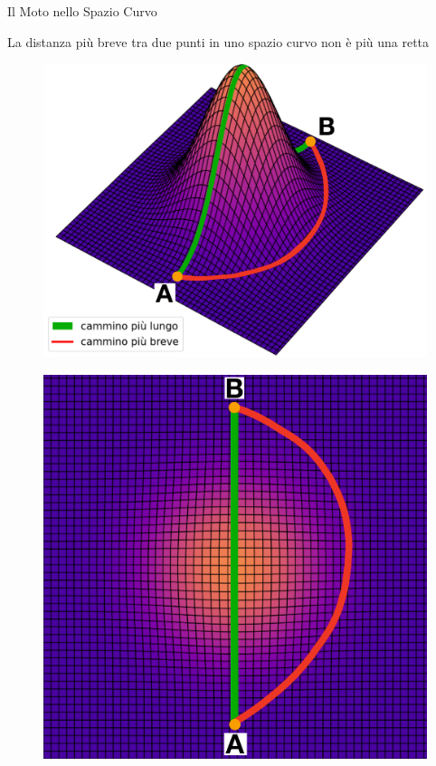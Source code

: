 \begin{frame}{Il Moto nello Spazio Curvo}

    La distanza più breve tra due punti in uno spazio curvo non è più una retta

    \vspace{1cm}

    \begin{minipage}{0.49 \textwidth}
        \begin{figure}
            \centering
            \includegraphics[width=\textwidth]{Figures/intro/shortest_path.PNG}
        \end{figure}
    \end{minipage}
    \begin{minipage}{0.49 \textwidth}
        \begin{figure}
            \centering
            \includegraphics[width= 0.7 \textwidth]{Figures/intro/shortest_path2.PNG}
        \end{figure}
    \end{minipage}

\end{frame}


%
%
